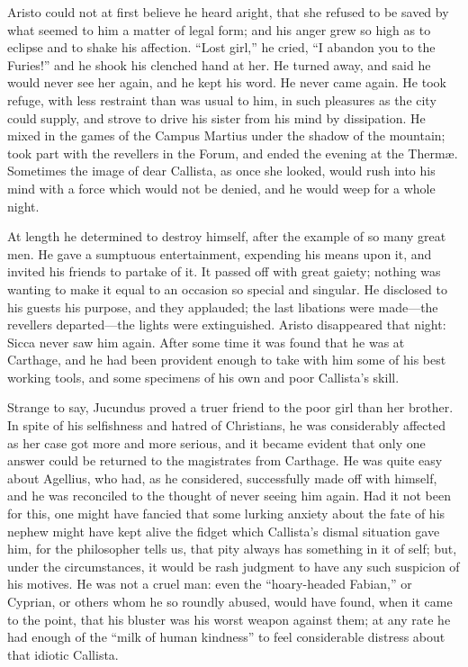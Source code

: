 Aristo could not at first believe he heard aright, that she refused
to be saved by what seemed to him a matter of legal form; and his
anger grew so high as to eclipse and to shake his affection.
``Lost girl,'' he cried, ``I abandon you to the
Furies!'' and he shook his clenched hand at her. He turned away,
and said he would never see her again, and he kept his word. He never
came again. He took refuge, with less restraint than was usual to him,
in such pleasures as the city could supply, and strove to drive his
sister from his mind by dissipation. He mixed in the games of the
Campus Martius under the shadow of the mountain; took part with the
revellers in the Forum, and ended the evening at the Thermæ.
Sometimes the image of dear Callista, as once she looked, would rush
into his mind with a force which would not be denied, and he would
weep for a whole night.

At length he determined to destroy himself, after the example of so
many great men. He gave a sumptuous entertainment, expending his means
upon it, and invited his friends to partake of it. It passed off with
great gaiety; nothing was wanting to make it equal to an occasion so
special and singular. He disclosed to his guests his purpose, and they
applauded; the last libations were made—the revellers departed—the
lights were extinguished. Aristo disappeared that night: Sicca never
saw him again. After some time it was found that he was at
Carthage, and he had been provident enough to take with him some of
his best working tools, and some specimens of his own and poor
Callista's skill.

Strange to say, Jucundus proved a truer friend to the poor girl
than her brother. In spite of his selfishness and hatred of
Christians, he was considerably affected as her case got more and more
serious, and it became evident that only one answer could be returned
to the magistrates from Carthage. He was quite easy about Agellius,
who had, as he considered, successfully made off with himself, and he
was reconciled to the thought of never seeing him again. Had it not
been for this, one might have fancied that some lurking anxiety about
the fate of his nephew might have kept alive the fidget which Callista's
dismal situation gave him, for the philosopher tells us, that pity
always has something in it of self; but, under the circumstances, it
would be rash judgment to have any such suspicion of his motives. He
was not a cruel man: even the ``hoary-headed Fabian,'' or
Cyprian, or others whom he so roundly abused, would have found, when
it came to the point, that his bluster was his worst weapon against
them; at any rate he had enough of the ``milk of human
kindness'' to feel considerable distress about that idiotic
Callista.

